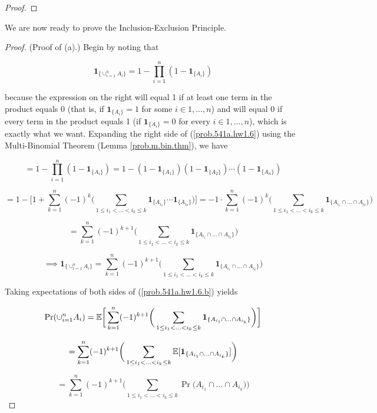 \begin{proof}

\end{proof}

We are now ready to prove the Inclusion-Exclusion Principle.

\begin{proof}(Proof of (a).) Begin by noting that 

\begin{equation} \label{prob.541a.hw1.6}
\boldsymbol{1}_{\{\cup_{i=1}^n A_i\}} = 1 - \prod_{i=1}^n (1 - \boldsymbol{1}_{\{A_i\}})
\end{equation}

because the expression on the right will equal 1 if at least one term in the product equals 0 (that is, if \(\boldsymbol{1}_{\{A_i\}} = 1\) for some \(i \in 1, \ldots, n\)) and will equal 0 if every term in the product equals 1 (if \(\boldsymbol{1}_{\{A_i\}} = 0\) for every \(i \in 1, \ldots, n\)), which is exactly what we want. Expanding the right side of (\ref{prob.541a.hw1.6}) using the Multi-Binomial Theorem (Lemma \ref{prob.m.bin.thm}), we have

\[
= 1 - \prod_{i=1}^n (1 - \boldsymbol{1}_{\{A_i\}}) = 1 -  (1 - \boldsymbol{1}_{\{A_1\}}) (1 - \boldsymbol{1}_{\{A_2\}}) \cdots (1 - \boldsymbol{1}_{\{A_n\}})  
\]

\[
 = 1 - \bigg[ 1 + \sum_{k=1}^n (-1)^{k} \bigg( \sum_{1 \leq i_1 < \ldots < i_k \leq k} \boldsymbol{1}_{\{A_{i_1}\}}  \cdots \boldsymbol{1}_{\{A_{i_k}\}}\bigg) \bigg]  = -1 \cdot \sum_{k=1}^n (-1)^{k} \bigg( \sum_{1 \leq i_1 < \ldots < i_k \leq k} \boldsymbol{1}_{\{A_{i_1} \cap \ldots \cap A_{i_k}\}}\bigg) 
\] 

\[
= \sum_{k=1}^n (-1)^{k+1} \bigg( \sum_{1 \leq i_1 < \ldots < i_k \leq k} \boldsymbol{1}_{\{A_{i_1} \cap \ldots \cap A_{i_k}\}}\bigg)
\]

\begin{equation} \label{prob.541a.hw1.6.b}
\implies \boldsymbol{1}_{\{\cup_{i=1}^n A_i\}} = \sum_{k=1}^n (-1)^{k+1} \bigg( \sum_{1 \leq i_1 < \ldots < i_k \leq k} \boldsymbol{1}_{\{A_{i_1} \cap \ldots \cap A_{i_k}\}}\bigg)
\end{equation}

Taking expectations of both sides of (\ref{prob.541a.hw1.6.b}) yields

\[
\Pr(\cup_{i=1}^{n}A_{i}) = \E \bigg[ \sum_{k=1}^n (-1)^{k+1} \bigg( \sum_{1 \leq i_1 < \ldots < i_k \leq k} \boldsymbol{1}_{\{A_{i_1} \cap \ldots \cap A_{i_k}\}}\bigg)\bigg]
\]

\[
= \sum_{k=1}^n (-1)^{k+1} \bigg( \sum_{1 \leq i_1 < \ldots < i_k \leq k} \E [ \boldsymbol{1}_{\{A_{i_1} \cap \ldots \cap A_{i_k}\}} ] \bigg)
\]

\[
= \sum_{k=1}^n (-1)^{k+1} \bigg( \sum_{1 \leq i_1 < \ldots < i_k \leq k} \Pr \big(A_{i_1} \cap \ldots \cap A_{i_k} \big) \bigg)
\]

\end{proof}


